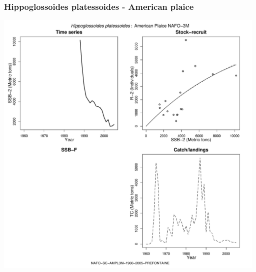 \subsubsection{Hippoglossoides platessoides - American plaice}
\begin{center}
\includegraphics[width=1.2\textwidth]{../R/figures/NAFO-SC-AMPL3M-1960-2005-PREFONTAINE.pdf}
\end{center}

